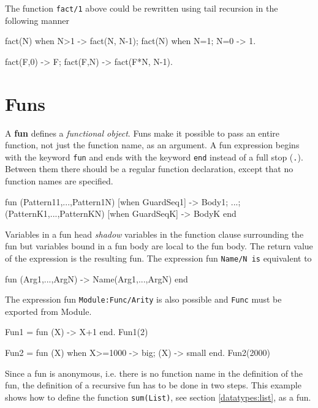 The function \texttt{fact/1} above could be rewritten using tail
recursion in the following manner

 \begin{erlang}
fact(N) when N>1 -> fact(N, N-1);
fact(N) when N=1; N=0 -> 1.

fact(F,0) -> F;                 %
fact(F,N) -> fact(F*N, N-1).
\end{erlang}


\section{Funs}
\label{functions:funs}
A \textbf{fun} defines a \textit{functional object}. Funs make it
possible to pass an entire function, not just the function name, as an
argument. A fun expression begins with the keyword \texttt{fun} and
ends with the keyword \texttt{end} instead of a full stop
(\texttt{.}). Between them there should be a regular function
declaration, except that no function names are specified.

\begin{erlang}
fun
    (Pattern11,...,Pattern1N) [when GuardSeq1] ->
        Body1;
        ...;
    (PatternK1,...,PatternKN) [when GuardSeqK] ->
        BodyK
end
\end{erlang}

Variables in a fun head \textit{shadow} variables in the function
clause surrounding the fun but variables bound in a fun body are local
to the fun body. The return value of the expression is the resulting
fun. The expression fun \texttt{Name/N is} equivalent to

\begin{erlang}
fun (Arg1,...,ArgN) -> Name(Arg1,...,ArgN) end
\end{erlang}

The expression fun \texttt{Module:Func/Arity} is also possible and
\texttt{Func} must be exported from Module.

\begin{erlang}
Fun1 = fun (X) -> X+1 end.
Fun1(2)         %

Fun2 = fun (X) when X>=1000 -> big; (X) -> small end.
Fun2(2000)      %
\end{erlang}

Since a fun is anonymous, i.e. there is no function name in the
definition of the fun, the definition of a recursive fun has to be
done in two steps. This example shows how to define the function
\texttt{sum(List)}, see section \ref{datatypes:list}, as a fun.

